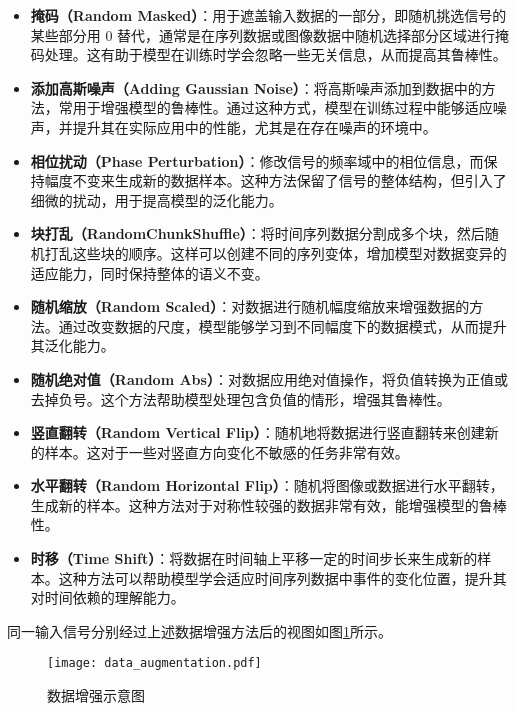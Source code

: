 \documentclass[master]{thesis-uestc}
\begin{document}
\begin{itemize}
    \item \textbf{掩码（Random Masked）}：用于遮盖输入数据的一部分，即随机挑选信号的某些部分用 0 替代，通常是在序列数据或图像数据中随机选择部分区域进行掩码处理。这有助于模型在训练时学会忽略一些无关信息，从而提高其鲁棒性。

    \item \textbf{添加高斯噪声（Adding Gaussian Noise）}：将高斯噪声添加到数据中的方法，常用于增强模型的鲁棒性。通过这种方式，模型在训练过程中能够适应噪声，并提升其在实际应用中的性能，尤其是在存在噪声的环境中。

    \item \textbf{相位扰动（Phase Perturbation）}：修改信号的频率域中的相位信息，而保持幅度不变来生成新的数据样本。这种方法保留了信号的整体结构，但引入了细微的扰动，用于提高模型的泛化能力。

    \item \textbf{块打乱（RandomChunkShuffle）}：将时间序列数据分割成多个块，然后随机打乱这些块的顺序。这样可以创建不同的序列变体，增加模型对数据变异的适应能力，同时保持整体的语义不变。

    \item \textbf{随机缩放（Random Scaled）}：对数据进行随机幅度缩放来增强数据的方法。通过改变数据的尺度，模型能够学习到不同幅度下的数据模式，从而提升其泛化能力。

    \item \textbf{随机绝对值（Random Abs）}：对数据应用绝对值操作，将负值转换为正值或去掉负号。这个方法帮助模型处理包含负值的情形，增强其鲁棒性。

    \item \textbf{竖直翻转（Random Vertical Flip）}：随机地将数据进行竖直翻转来创建新的样本。这对于一些对竖直方向变化不敏感的任务非常有效。

    \item \textbf{水平翻转（Random Horizontal Flip）}：随机将图像或数据进行水平翻转，生成新的样本。这种方法对于对称性较强的数据非常有效，能增强模型的鲁棒性。

    \item \textbf{时移（Time Shift）}：将数据在时间轴上平移一定的时间步长来生成新的样本。这种方法可以帮助模型学会适应时间序列数据中事件的变化位置，提升其对时间依赖的理解能力。
\end{itemize}

同一输入信号分别经过上述数据增强方法后的视图如图\ref{data_augmentation}所示。
\begin{figure}[h]
    \centering
    \texttt{[image: data\_augmentation.pdf]}
    \caption{数据增强示意图}
    \label{data_augmentation}
\end{figure}
\end{document}
